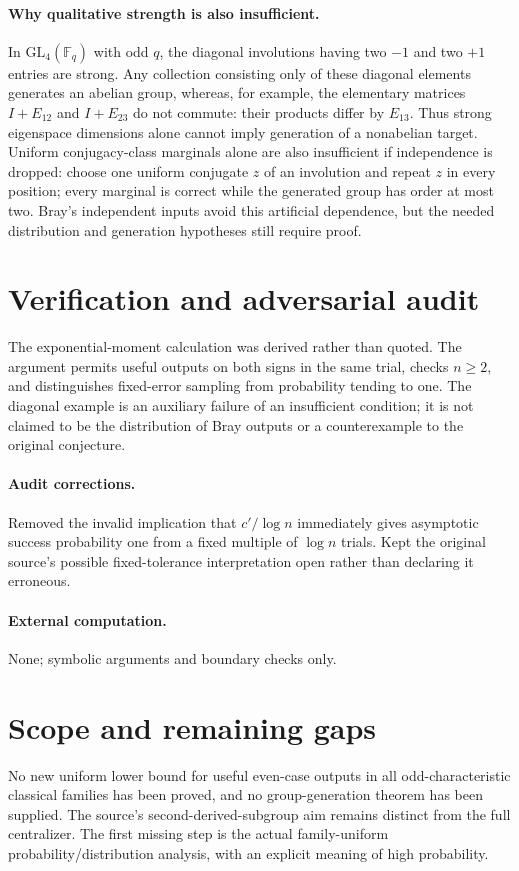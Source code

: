 \documentclass[11pt]{article}
\begin{document}
\paragraph{Why qualitative strength is also insufficient.}
In $\mathrm{GL}_4(\mathbb F_q)$ with odd $q$, the diagonal involutions having two $-1$ and two $+1$ entries are strong. Any collection consisting only of these diagonal elements generates an abelian group, whereas, for example, the elementary matrices $I+E_{12}$ and $I+E_{23}$ do not commute: their products differ by $E_{13}$. Thus strong eigenspace dimensions alone cannot imply generation of a nonabelian target. Uniform conjugacy-class marginals alone are also insufficient if independence is dropped: choose one uniform conjugate $z$ of an involution and repeat $z$ in every position; every marginal is correct while the generated group has order at most two. Bray's independent inputs avoid this artificial dependence, but the needed distribution and generation hypotheses still require proof.
\section{Verification and adversarial audit}
The exponential-moment calculation was derived rather than quoted. The argument permits useful outputs on both signs in the same trial, checks $n\ge2$, and distinguishes fixed-error sampling from probability tending to one. The diagonal example is an auxiliary failure of an insufficient condition; it is not claimed to be the distribution of Bray outputs or a counterexample to the original conjecture.
\paragraph{Audit corrections.} Removed the invalid implication that $c'/\log n$ immediately gives asymptotic success probability one from a fixed multiple of $\log n$ trials. Kept the original source's possible fixed-tolerance interpretation open rather than declaring it erroneous.
\paragraph{External computation.} None; symbolic arguments and boundary checks only.
\section{Scope and remaining gaps}
No new uniform lower bound for useful even-case outputs in all odd-characteristic classical families has been proved, and no group-generation theorem has been supplied. The source's second-derived-subgroup aim remains distinct from the full centralizer. The first missing step is the actual family-uniform probability/distribution analysis, with an explicit meaning of high probability.
\end{document}

